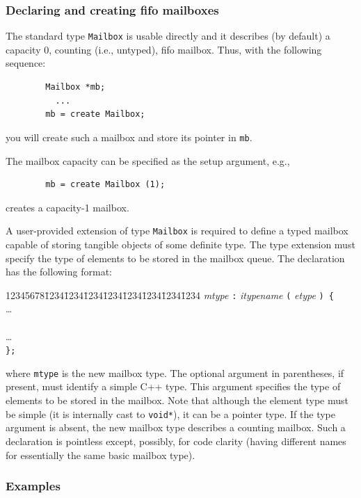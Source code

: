 \subsubsection{Declaring and creating fifo mailboxes}
\label{rm_mb_fi_dc}

The standard type {\tt Mailbox} is usable directly and it describes
(by default) a capacity 0, counting (i.e., untyped), fifo mailbox.
Thus, with the following sequence:

\begin{verbatim}
        Mailbox *mb;
          ...
        mb = create Mailbox;
\end{verbatim}
you will create such a mailbox and store its pointer in {\tt mb}.

The mailbox capacity can be specified as the setup argument, e.g.,
\begin{verbatim}
        mb = create Mailbox (1);
\end{verbatim}
creates a capacity-1 mailbox.

A user-provided extension of type {\tt Mailbox} is required to define
a typed mailbox capable of storing tangible objects of some definite type.
The type extension must specify the type of elements to be stored in
the mailbox queue.
The declaration has the following format:

{\tt\begin{tabbing}
12345678\=1234\=1234\=1234\=1234\=1234\=1234\=1234\=1234\kill
{} {\em mtype\/} {\tt :} {\em itypename\/} {\tt (} {\em etype\/} {\tt ) \{} \\
\> \>\ldots \\
\>  \\
\> \>\ldots \\
\> {\tt \};}
\end{tabbing}}
where {\tt mtype} is the new mailbox type.
The optional argument in parentheses,
if present, must identify a simple C++ type.
This argument specifies the type of elements to be stored in the mailbox.
Note that although the element type must be simple (it is internally cast to
{\tt void*}), it can be a pointer type.
If the type argument is absent, the new mailbox type describes a counting
mailbox.
Such a declaration is pointless except, possibly, for code clarity
(having different names for essentially the same basic mailbox type).

\subsubsection*{Examples}


